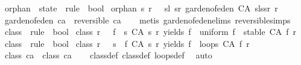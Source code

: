 \begin{isabellebody}
\isanewline
{}\isamarkupfalse%
\ orphan\ {\isacharcolon}{\isacharcolon}\ {\isachardoublequoteopen}state\ {\isasymRightarrow}\ rule\ {\isasymRightarrow}\ bool{\isachardoublequoteclose}\ \isanewline
{\isachardoublequoteopen}orphan\ s{}\ r\ {\isacharequal}\ {\isacharparenleft}{\isasymforall}\ sl\ sr{\isachardot}\ garden{\isacharunderscore}of{\isacharunderscore}eden\ {\isacharparenleft}CA\ {\isacharparenleft}sl{\isacharat}s{}{\isacharat}sr{\isacharparenright}\ r{\isacharparenright}{\isacharparenright}{\isachardoublequoteclose}\isanewline
\isanewline
{}\isamarkupfalse%
\ {\isachardoublequoteopen}garden{\isacharunderscore}of{\isacharunderscore}eden\ ca\ {\isasymLongrightarrow}\ {\isasymnot}reversible\ ca{\isachardoublequoteclose}\isanewline
%
\isadelimproof
\ \ %
\endisadelimproof
%
\isatagproof
{}\isamarkupfalse%
\ {\isacharparenleft}metis\ garden{\isacharunderscore}of{\isacharunderscore}eden{\isachardot}elims{\isacharparenleft}{}{\isacharparenright}\ reversible{\isachardot}simps{\isacharparenright}\isanewline
{}\isamarkupfalse%
%
\endisatagproof
{\isafoldproof}%
%
\isadelimproof
\isanewline
%
\endisadelimproof
\isanewline
\isanewline
\isanewline
{}\isamarkupfalse%
\ class{}\ {\isacharcolon}{\isacharcolon}\ {\isachardoublequoteopen}rule\ {\isasymRightarrow}\ bool{\isachardoublequoteclose}\ \isanewline
{\isachardoublequoteopen}class{}\ r\ {\isasymequiv}\ {\isacharparenleft}{\isasymexists}{\isacharbang}\ f{\isachardot}\ {\isacharparenleft}{\isasymforall}\ s{\isachardot}\ {\isacharparenleft}CA\ s\ r{\isacharparenright}\ yields\ f\ {\isasymand}\ uniform\ f\ {\isasymand}\ stable\ {\isacharparenleft}CA\ f\ r{\isacharparenright}{\isacharparenright}{\isacharparenright}{\isachardoublequoteclose}\isanewline
\isanewline
{}\isamarkupfalse%
\ class{}\ {\isacharcolon}{\isacharcolon}\ {\isachardoublequoteopen}rule\ {\isasymRightarrow}\ bool{\isachardoublequoteclose}\ \isanewline
{\isachardoublequoteopen}class{}\ r\ {\isasymequiv}\ {\isacharparenleft}{\isasymforall}\ s{\isachardot}\ {\isacharparenleft}{\isasymexists}\ f{\isachardot}\ {\isacharparenleft}CA\ s\ r{\isacharparenright}\ yields\ f\ {\isasymand}\ loops\ {\isacharparenleft}CA\ f\ r{\isacharparenright}{\isacharparenright}{\isacharparenright}{\isachardoublequoteclose}\isanewline
\isanewline
{}\isamarkupfalse%
\ {\isachardoublequoteopen}class{}\ ca\ {\isasymLongrightarrow}\ class{}\ ca{\isachardoublequoteclose}\isanewline
%
\isadelimproof
\ \ %
\endisadelimproof
%
\isatagproof
{}\isamarkupfalse%
\ class{}{\isacharunderscore}def\ class{}{\isacharunderscore}def\ loops{\isacharunderscore}def\ \isamarkupfalse%
\ auto%
\endisatagproof
{\isafoldproof}%
%
\isadelimproof
\isanewline
%
\endisadelimproof
%
\isadelimtheory
%
\endisadelimtheory
%
\isatagtheory
{}\isamarkupfalse%
%
\endisatagtheory
{\isafoldtheory}%
%
\isadelimtheory
%
\endisadelimtheory
%
\end{isabellebody}%
